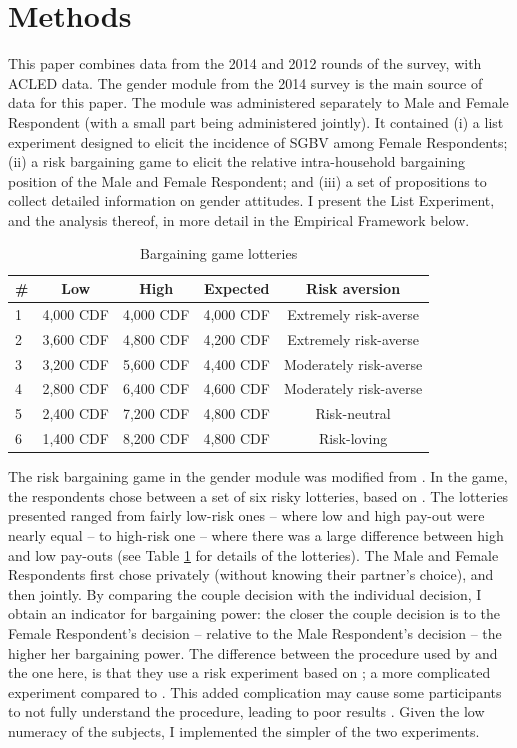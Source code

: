 \section{Methods}
This paper combines data from the 2014 and 2012 rounds of the survey, with ACLED data. The gender module from the 2014 survey is the main source of data for this paper. The module was administered separately to Male and Female Respondent (with a small part being administered jointly). It contained (i) a list experiment designed to elicit the incidence of SGBV among Female Respondents; (ii) a risk bargaining game to elicit the relative intra-household bargaining position of the Male and Female Respondent; and (iii) a set of propositions to collect detailed information on gender attitudes. I present the List Experiment, and the analysis thereof, in more detail in the Empirical Framework below. 

\begin{table}[htb]
	\centering
	\caption{Bargaining game lotteries}
	\label{tab:bargaining}
	\begin{tabular}{l c c c c}
	\toprule
	\# & Low & High & Expected & Risk aversion \\
	\hline
	1 & 4,000 CDF & 4,000 CDF & 4,000 CDF & Extremely risk-averse \\
	2 & 3,600 CDF & 4,800 CDF & 4,200 CDF & Extremely risk-averse \\
	3 & 3,200 CDF & 5,600 CDF & 4,400 CDF & Moderately risk-averse \\
	4 & 2,800 CDF & 6,400 CDF & 4,600 CDF & Moderately risk-averse \\
	5 & 2,400 CDF & 7,200 CDF & 4,800 CDF & Risk-neutral \\
	6 & 1,400 CDF & 8,200 CDF & 4,800 CDF & Risk-loving \\ 
	\bottomrule
	\end{tabular}
\end{table}

The risk bargaining game in the gender module was modified from \cite{Martinsson2009}. In the game, the respondents chose between a set of six risky lotteries, based on \cite{Eckel2002}. The lotteries presented ranged from fairly low-risk ones -- where low and high pay-out were nearly equal -- to high-risk one -- where there was a large difference between high and low pay-outs (see Table \ref{tab:bargaining} for details of the lotteries). The Male and Female Respondents first chose privately (without knowing their partner's choice), and then jointly. By comparing the couple decision with the individual decision, I obtain an indicator for bargaining power: the closer the couple decision is to the Female Respondent's decision -- relative to the Male Respondent's decision -- the higher her bargaining power. The difference between the procedure used by \cite{Martinsson2009} and the one here, is that they use a risk experiment based on \cite{Holt2002}; a more complicated experiment compared to \citeauthor{Eckel2002}. This added complication may cause some participants to not fully understand the procedure, leading to poor results \citep{Dave2010a}. Given the low numeracy of the subjects, I implemented the simpler of the two experiments.

